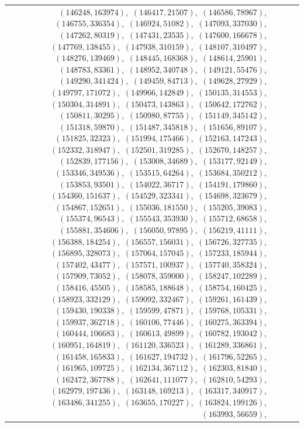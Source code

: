 \documentclass[11pt]{article}
\begin{document}
\begin{longtable}{@{}rrl>{\raggedright\arraybackslash}p{}@{}}
$(146248,163974)$,\allowbreak\ $(146417,21507)$,\allowbreak\ $(146586,78967)$,\allowbreak\ $(146755,336354)$,\allowbreak\ $(146924,51082)$,\allowbreak\ $(147093,337030)$,\allowbreak\ $(147262,80319)$,\allowbreak\ $(147431,23535)$,\allowbreak\ $(147600,166678)$,\allowbreak\ $(147769,138455)$,\allowbreak\ $(147938,310159)$,\allowbreak\ $(148107,310497)$,\allowbreak\ $(148276,139469)$,\allowbreak\ $(148445,168368)$,\allowbreak\ $(148614,25901)$,\allowbreak\ $(148783,83361)$,\allowbreak\ $(148952,340748)$,\allowbreak\ $(149121,55476)$,\allowbreak\ $(149290,341424)$,\allowbreak\ $(149459,84713)$,\allowbreak\ $(149628,27929)$,\allowbreak\ $(149797,171072)$,\allowbreak\ $(149966,142849)$,\allowbreak\ $(150135,314553)$,\allowbreak\ $(150304,314891)$,\allowbreak\ $(150473,143863)$,\allowbreak\ $(150642,172762)$,\allowbreak\ $(150811,30295)$,\allowbreak\ $(150980,87755)$,\allowbreak\ $(151149,345142)$,\allowbreak\ $(151318,59870)$,\allowbreak\ $(151487,345818)$,\allowbreak\ $(151656,89107)$,\allowbreak\ $(151825,32323)$,\allowbreak\ $(151994,175466)$,\allowbreak\ $(152163,147243)$,\allowbreak\ $(152332,318947)$,\allowbreak\ $(152501,319285)$,\allowbreak\ $(152670,148257)$,\allowbreak\ $(152839,177156)$,\allowbreak\ $(153008,34689)$,\allowbreak\ $(153177,92149)$,\allowbreak\ $(153346,349536)$,\allowbreak\ $(153515,64264)$,\allowbreak\ $(153684,350212)$,\allowbreak\ $(153853,93501)$,\allowbreak\ $(154022,36717)$,\allowbreak\ $(154191,179860)$,\allowbreak\ $(154360,151637)$,\allowbreak\ $(154529,323341)$,\allowbreak\ $(154698,323679)$,\allowbreak\ $(154867,152651)$,\allowbreak\ $(155036,181550)$,\allowbreak\ $(155205,39083)$,\allowbreak\ $(155374,96543)$,\allowbreak\ $(155543,353930)$,\allowbreak\ $(155712,68658)$,\allowbreak\ $(155881,354606)$,\allowbreak\ $(156050,97895)$,\allowbreak\ $(156219,41111)$,\allowbreak\ $(156388,184254)$,\allowbreak\ $(156557,156031)$,\allowbreak\ $(156726,327735)$,\allowbreak\ $(156895,328073)$,\allowbreak\ $(157064,157045)$,\allowbreak\ $(157233,185944)$,\allowbreak\ $(157402,43477)$,\allowbreak\ $(157571,100937)$,\allowbreak\ $(157740,358324)$,\allowbreak\ $(157909,73052)$,\allowbreak\ $(158078,359000)$,\allowbreak\ $(158247,102289)$,\allowbreak\ $(158416,45505)$,\allowbreak\ $(158585,188648)$,\allowbreak\ $(158754,160425)$,\allowbreak\ $(158923,332129)$,\allowbreak\ $(159092,332467)$,\allowbreak\ $(159261,161439)$,\allowbreak\ $(159430,190338)$,\allowbreak\ $(159599,47871)$,\allowbreak\ $(159768,105331)$,\allowbreak\ $(159937,362718)$,\allowbreak\ $(160106,77446)$,\allowbreak\ $(160275,363394)$,\allowbreak\ $(160444,106683)$,\allowbreak\ $(160613,49899)$,\allowbreak\ $(160782,193042)$,\allowbreak\ $(160951,164819)$,\allowbreak\ $(161120,336523)$,\allowbreak\ $(161289,336861)$,\allowbreak\ $(161458,165833)$,\allowbreak\ $(161627,194732)$,\allowbreak\ $(161796,52265)$,\allowbreak\ $(161965,109725)$,\allowbreak\ $(162134,367112)$,\allowbreak\ $(162303,81840)$,\allowbreak\ $(162472,367788)$,\allowbreak\ $(162641,111077)$,\allowbreak\ $(162810,54293)$,\allowbreak\ $(162979,197436)$,\allowbreak\ $(163148,169213)$,\allowbreak\ $(163317,340917)$,\allowbreak\ $(163486,341255)$,\allowbreak\ $(163655,170227)$,\allowbreak\ $(163824,199126)$,\allowbreak\ $(163993,56659)$,\allowbreak\ 
\end{longtable}
\end{document}
